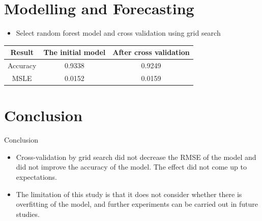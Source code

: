 \documentclass[
 size=14pt,
 paper=smartboard,  %
 mode=present, 		%
 display=slides, 	%
 style=tuliplab,  	%
 pauseslide,
 fleqn,leqno]{powerdot}
\begin{document}
\section{Modelling and Forecasting}


\begin{slide}{}
  
\begin{itemize}
\item
Select random forest model and cross validation using grid search
  
\end{itemize} 
\vspace{1.5cm}
\begin{tabular}{ c | c | c  }
\toprule
Result     &  The initial model    & After cross validation       \\
\midrule
Accuracy       &  0.9338   &  0.9249       \\
  
MSLE      &  0.0152   &  0.0159     \\
  
\bottomrule       
\end{tabular}



  
  
  
\end{slide}
      


\section{Conclusion}


\begin{slide}[toc=,bm=]{Conclusion}

\begin{center}
\begin{itemize}

\item
Cross-validation by grid search did not decrease the RMSE of the model and did not improve the accuracy of the model.
The effect did not come up to expectations.
\item
The limitation of this study is that it does not consider whether there is overfitting of the model, and further experiments can be carried out in future studies.

\end{itemize}
\end{center}


\end{slide}
\end{document}
